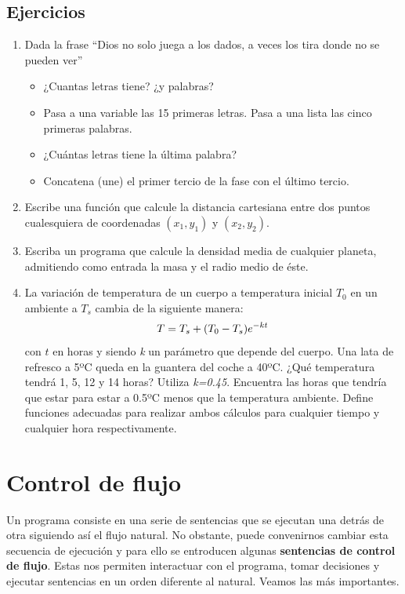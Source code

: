 \documentclass[letterpaper,10pt,spanish]{sphinxmanual}
\begin{document}
\section{Ejercicios}
\label{ejecutables:ejercicios}\begin{enumerate}
\item {} 
Dada la frase ``Dios no solo juega a los dados, a veces los tira donde no se pueden ver''
\begin{itemize}
\item {} 
¿Cuantas letras tiene? ¿y palabras?

\item {} 
Pasa a una variable las 15 primeras letras. Pasa a una lista las cinco primeras palabras.

\item {} 
¿Cuántas letras tiene la última palabra?

\item {} 
Concatena (une) el primer tercio de la fase con el último tercio.

\end{itemize}

\item {} 
Escribe una función que calcule la distancia cartesiana entre dos puntos cualesquiera de coordenadas $(x_1, y_1)$ y  $(x_2, y_2)$.

\item {} 
Escriba un programa que calcule la densidad media de cualquier planeta, admitiendo como entrada la masa y el radio medio de éste.

\item {} 
La variación de temperatura de un cuerpo a temperatura inicial $T_0$ en un ambiente a $T_s$ cambia de la siguiente manera:
\begin{gather}
\begin{split}T =  T_s + (T_0 - T_s)e^{-kt}\end{split}\notag
\end{gather}
con $t$ en horas y siendo \emph{k} un parámetro que depende del cuerpo. Una lata de refresco a 5ºC queda en la guantera del coche a 40ºC. ¿Qué temperatura tendrá 1, 5, 12 y 14 horas? Utiliza \emph{k=0.45}. Encuentra las horas que tendría que estar para estar a 0.5ºC menos que la temperatura ambiente. Define funciones adecuadas para realizar ambos cálculos para cualquier tiempo y cualquier hora respectivamente.

\end{enumerate}


\chapter{Control de flujo}
\label{control_de_flujo:control-de-flujo}\label{control_de_flujo::doc}
Un programa consiste en una serie de sentencias que se ejecutan una detrás de otra siguiendo así el flujo natural. No obstante, puede convenirnos cambiar esta secuencia de ejecución y para ello se entroducen algunas \textbf{sentencias de control de flujo}. Estas nos permiten interactuar con el programa, tomar decisiones y ejecutar sentencias en un orden diferente al natural. Veamos las más importantes.
\end{document}

